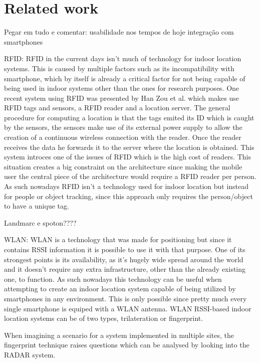 \section{Related work}
\label{sec:related}

Pegar em tudo e comentar:
	usabilidade nos tempos de hoje
	integração com smartphones


RFID:
	\ac{RFID} in the current days isn't much of technology for indoor location systems. This is caused by multiple factors such as its incompatibility with smartphone, which by itself is already a critical factor for not being capable of being used in indoor systems other than the ones for research purposes. One recent system using \ac{RFID} was presented by Han Zou et al. \cite{rfid_sys} which makes use RFID tags and sensors, a \ac{RFID} reader and a location server. The general procedure for computing a location is that the tags emited its ID which is caught by the sensors, the sensors make use of its external power supply to allow the creation of a continuous wireless connection with the reader. Once the reader receives the data he forwards it to the server where the location is obtained. This system introces one of the issues of RFID which is the high cost of readers. This situation creates a big constraint on the architecture since making the mobile user the central piece of the architecture would require a \ac{RFID} reader per person. As such nowadays \ac{RFID} isn't a technology used for indoor location but instead for people or object tracking, since this approach only requires the person/object to have a unique tag. 
	
	Landmarc e spoton????

WLAN:
	WLAN is a technology that was made for positioning but since it contains \ac{RSSI} information it is possible to use it with that purpose. One of its strongest points is its availability, as it's hugely wide spread around the world and it doesn't require any extra infrastructure, other than the already existing one, to function. As such nowadays this technology can be useful when attempting to create an indoor location system capable of being utilized by smartphones in any environment. This is only possible since pretty much every single smartphone is equiped with a WLAN antenna.
	WLAN \ac{RSSI}-based indoor location systems can be of two types, trilateration or fingerprint.

	When imagining a scenario for a system implemented in multiple sites, the fingerprint technique raises questions which can be analysed by looking into the RADAR system. 

